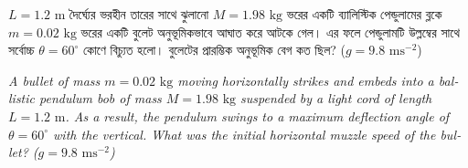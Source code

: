 \documentclass[12pt, a4paper]{article}
\begin{document}
{{\newpage

\begin{tcolorbox}[questionbox={প্রশ্ন (Question) 18}]
    \noindent
    $L = 1.2\text{ m}$ দৈর্ঘ্যের ভরহীন তারের সাথে ঝুলানো $M = 1.98\text{ kg}$ ভরের একটি ব্যালিস্টিক পেন্ডুলামের ব্লকে $m = 0.02\text{ kg}$ ভরের একটি বুলেট অনুভূমিকভাবে আঘাত করে আটকে গেল। এর ফলে পেন্ডুলামটি উল্লম্বের সাথে সর্বোচ্চ $\theta = 60^\circ$ কোণে বিচ্যুত হলো। বুলেটের প্রারম্ভিক অনুভূমিক বেগ কত ছিল? ($g = 9.8\text{ ms}^{-2}$)
    
    \vspace{0.8em}
    \begin{english}
    \noindent\textit{\color{darkgray}
    A bullet of mass $m = 0.02\text{ kg}$ moving horizontally strikes and embeds into a ballistic pendulum bob of mass $M = 1.98\text{ kg}$ suspended by a light cord of length $L = 1.2\text{ m}$. As a result, the pendulum swings to a maximum deflection angle of $\theta = 60^\circ$ with the vertical. What was the initial horizontal muzzle speed of the bullet? ($g = 9.8\text{ ms}^{-2}$)
    }
    \end{english}
\end{tcolorbox}

\vspace{1em}
\begin{center}
\end{center}
\vspace{1em}

}}
\end{document}
